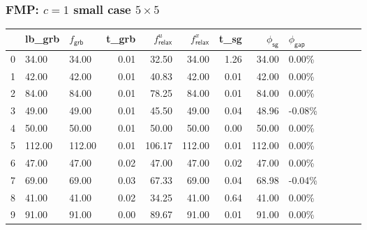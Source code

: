 \begin{frame}
  \frametitle{FMP: \(c=1\) small case \(5\times 5\)}
  \scriptsize
  \begin{tabular}{lllrrrrrlllll}
    \toprule
    {} & lb\_grb                  & \(f_{\textsf{grb}}\)     & t\_grb
       & \(f^u_{\textsf{relax}}\) & \(f^x_{\textsf{relax}}\)
       & t\_sg                    & \(\phi_{\textsf{sg}}\)   & \(\phi_{\textsf{gap}}\)                                             \\
    \midrule
    0  & 34.00                    & 34.00                    & 0.01                    & 32.50  & 34.00  & 1.26 & 34.00  & 0.00\%  \\
    1  & 42.00                    & 42.00                    & 0.01                    & 40.83  & 42.00  & 0.01 & 42.00  & 0.00\%  \\
    2  & 84.00                    & 84.00                    & 0.01                    & 78.25  & 84.00  & 0.01 & 84.00  & 0.00\%  \\
    3  & 49.00                    & 49.00                    & 0.01                    & 45.50  & 49.00  & 0.04 & 48.96  & -0.08\% \\
    4  & 50.00                    & 50.00                    & 0.01                    & 50.00  & 50.00  & 0.00 & 50.00  & 0.00\%  \\
    5  & 112.00                   & 112.00                   & 0.01                    & 106.17 & 112.00 & 0.01 & 112.00 & 0.00\%  \\
    6  & 47.00                    & 47.00                    & 0.02                    & 47.00  & 47.00  & 0.02 & 47.00  & 0.00\%  \\
    7  & 69.00                    & 69.00                    & 0.03                    & 67.33  & 69.00  & 0.04 & 68.98  & -0.04\% \\
    8  & 41.00                    & 41.00                    & 0.02                    & 34.25  & 41.00  & 0.64 & 41.00  & 0.00\%  \\
    9  & 91.00                    & 91.00                    & 0.00                    & 89.67  & 91.00  & 0.01 & 91.00  & 0.00\%  \\

    \bottomrule
  \end{tabular}
  \normalsize
\end{frame}

